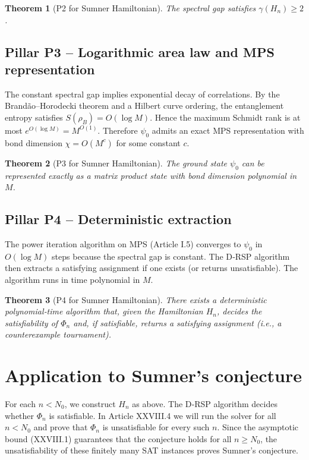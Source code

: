 \documentclass[11pt,a4paper]{article}
\newtheorem{theorem}{Theorem}[section]
\begin{document}
\begin{theorem}[P2 for Sumner Hamiltonian]
The spectral gap satisfies $\gamma(H_n) \ge 2$.
\end{theorem}

\subsection{Pillar P3 – Logarithmic area law and MPS representation}
The constant spectral gap implies exponential decay of correlations. By the Brandão–Horodecki theorem and a Hilbert curve ordering, the entanglement entropy satisfies $S(\rho_B) = O(\log M)$. Hence the maximum Schmidt rank is at most $e^{O(\log M)} = M^{O(1)}$. Therefore $\psi_0$ admits an exact MPS representation with bond dimension $\chi = O(M^c)$ for some constant $c$.

\begin{theorem}[P3 for Sumner Hamiltonian]
The ground state $\psi_0$ can be represented exactly as a matrix product state with bond dimension polynomial in $M$.
\end{theorem}

\subsection{Pillar P4 – Deterministic extraction}
The power iteration algorithm on MPS (Article I.5) converges to $\psi_0$ in $O(\log M)$ steps because the spectral gap is constant. The D‑RSP algorithm then extracts a satisfying assignment if one exists (or returns unsatisfiable). The algorithm runs in time polynomial in $M$.

\begin{theorem}[P4 for Sumner Hamiltonian]
There exists a deterministic polynomial‑time algorithm that, given the Hamiltonian $H_n$, decides the satisfiability of $\Phi_n$ and, if satisfiable, returns a satisfying assignment (i.e., a counterexample tournament).
\end{theorem}

\section{Application to Sumner's conjecture}
For each $n < N_0$, we construct $H_n$ as above. The D‑RSP algorithm decides whether $\Phi_n$ is satisfiable. In Article XXVIII.4 we will run the solver for all $n < N_0$ and prove that $\Phi_n$ is unsatisfiable for every such $n$. Since the asymptotic bound (XXVIII.1) guarantees that the conjecture holds for all $n \ge N_0$, the unsatisfiability of these finitely many SAT instances proves Sumner's conjecture.
\end{document}
